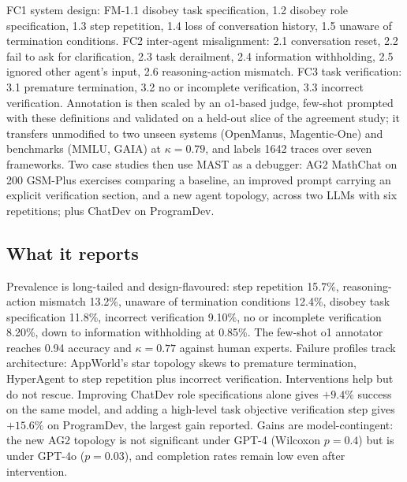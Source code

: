 FC1 system design: FM-1.1 disobey task specification, 1.2 disobey role specification, 1.3 step repetition, 1.4 loss of conversation history, 1.5 unaware of termination conditions. FC2 inter-agent misalignment: 2.1 conversation reset, 2.2 fail to ask for clarification, 2.3 task derailment, 2.4 information withholding, 2.5 ignored other agent's input, 2.6 reasoning-action mismatch. FC3 task verification: 3.1 premature termination, 3.2 no or incomplete verification, 3.3 incorrect verification. Annotation is then scaled by an o1-based judge, few-shot prompted with these definitions and validated on a held-out slice of the agreement study; it transfers unmodified to two unseen systems (OpenManus, Magentic-One) and benchmarks (MMLU, GAIA) at $\kappa = 0.79$, and labels 1642 traces over seven frameworks. Two case studies then use MAST as a debugger: AG2 MathChat on 200 GSM-Plus exercises comparing a baseline, an improved prompt carrying an explicit verification section, and a new agent topology, across two LLMs with six repetitions; plus ChatDev on ProgramDev.

\subsection{What it reports}

Prevalence is long-tailed and design-flavoured: step repetition 15.7\%, reasoning-action mismatch 13.2\%, unaware of termination conditions 12.4\%, disobey task specification 11.8\%, incorrect verification 9.10\%, no or incomplete verification 8.20\%, down to information withholding at 0.85\%. The few-shot o1 annotator reaches 0.94 accuracy and $\kappa = 0.77$ against human experts. Failure profiles track architecture: AppWorld's star topology skews to premature termination, HyperAgent to step repetition plus incorrect verification. Interventions help but do not rescue. Improving ChatDev role specifications alone gives $+9.4\%$ success on the same model, and adding a high-level task objective verification step gives $+15.6\%$ on ProgramDev, the largest gain reported. Gains are model-contingent: the new AG2 topology is not significant under GPT-4 (Wilcoxon $p = 0.4$) but is under GPT-4o ($p = 0.03$), and completion rates remain low even after intervention.

